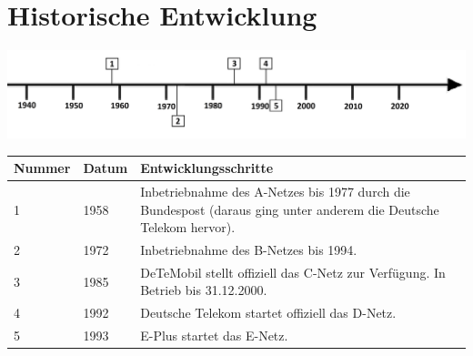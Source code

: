 \section*{Historische Entwicklung}
\includegraphics[width=\textwidth]{Kapitel/C-Netz/Grafiken/Zeitstrahl}
\par
\noindent
\begin{tabular}{|p{1 cm}|p{1 cm}|p{15.55 cm}|}
	\hline
	Nummer & Datum & Entwicklungsschritte~\cite{c-netz.7}\\
	\hline
	1 & 1958 & Inbetriebnahme des A-Netzes bis 1977 durch die Bundespost (daraus ging unter anderem die Deutsche Telekom hervor).\\
	\hline
	2 & 1972 & Inbetriebnahme des B-Netzes bis 1994. \\
	\hline
	3 & 1985 & DeTeMobil stellt offiziell das C-Netz zur Verfügung. In Betrieb bis 31.12.2000.\\
	\hline
	4 & 1992 & Deutsche Telekom startet offiziell das D-Netz.\\
	\hline
	5 & 1993 & E-Plus startet das E-Netz.\\
	\hline
\end{tabular}
\par
